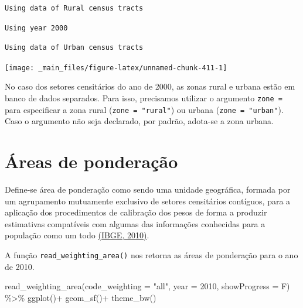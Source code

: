 \documentclass[
  brazilian,
]{book}
\newenvironment{Shaded}{\begin{snugshade}}{\end{snugshade}}
\newcommand{\AttributeTok}[1]{\textcolor[rgb]{0.77,0.63,0.00}{#1}}
\newcommand{\DecValTok}[1]{\textcolor[rgb]{0.00,0.00,0.81}{#1}}
\newcommand{\FunctionTok}[1]{\textcolor[rgb]{0.00,0.00,0.00}{#1}}
\newcommand{\NormalTok}[1]{#1}
\newcommand{\SpecialCharTok}[1]{\textcolor[rgb]{0.00,0.00,0.00}{#1}}
\newcommand{\StringTok}[1]{\textcolor[rgb]{0.31,0.60,0.02}{#1}}
\begin{document}
\begin{verbatim}
Using data of Rural census tracts
\end{verbatim}

\begin{verbatim}
Using year 2000
\end{verbatim}

\begin{verbatim}
Using data of Urban census tracts
\end{verbatim}

\begin{center}\texttt{[image: \_main\_files/figure-latex/unnamed-chunk-411-1]} \end{center}

No caso dos setores censitários do ano de 2000, as zonas rural e urbana estão em banco de dados separados. Para isso, precisamos utilizar o argumento \texttt{zone\ =} para especificar a zona rural (\texttt{zone\ =\ "rural"}) ou urbana (\texttt{zone\ =\ "urban"}). Caso o argumento não seja declarado, por padrão, adota-se a zona urbana.

\hypertarget{uxe1reas-de-ponderauxe7uxe3o}{%
\section{Áreas de ponderação}\label{uxe1reas-de-ponderauxe7uxe3o}}

Define-se área de ponderação como sendo uma unidade geográfica, formada por um agrupamento mutuamente exclusivo de setores censitários contíguos, para a aplicação dos procedimentos de calibração dos pesos de forma a produzir estimativas compatíveis com algumas das informações conhecidas para a população como um todo \href{https://www.ibge.gov.br/estatisticas/sociais/populacao/9662-censo-demografico-2010.html?edicao=9754\&t=sobre}{(IBGE, 2010)}.

A função \texttt{read\_weighting\_area()} nos retorna as áreas de ponderação para o ano de 2010.

\begin{Shaded}
\begin{Highlighting}[]
\FunctionTok{read\_weighting\_area}\NormalTok{(}\AttributeTok{code\_weighting =} \StringTok{"all"}\NormalTok{,}
                    \AttributeTok{year =} \DecValTok{2010}\NormalTok{,}
                    \AttributeTok{showProgress =}\NormalTok{ F) }\SpecialCharTok{\%\textgreater{}\%} 
  \FunctionTok{ggplot}\NormalTok{()}\SpecialCharTok{+}
  \FunctionTok{geom\_sf}\NormalTok{()}\SpecialCharTok{+}
  \FunctionTok{theme\_bw}\NormalTok{()}
\end{Highlighting}
\end{Shaded}
\end{document}
